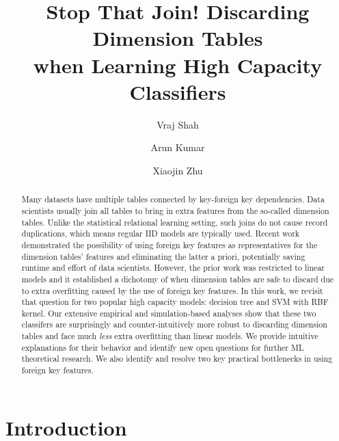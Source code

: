 \documentclass[sigconf]{acmart}
\begin{document}
\title{Stop That Join! Discarding Dimension Tables \\when Learning High Capacity Classifiers}

\author{Vraj Shah}
\author{Arun Kumar}
\author{Xiaojin Zhu}

\begin{abstract}
Many datasets have multiple tables connected by key-foreign key dependencies.
Data scientists usually join all tables to bring in extra features from the so-called 
dimension tables. Unlike the statistical relational learning setting, such joins do 
not cause record duplications, which means regular IID models are typically used. Recent
work demonstrated the possibility of using foreign key features as representatives for the 
dimension tables' features and eliminating the latter a priori, potentially saving runtime
and effort of data scientists. However, the prior work was restricted to linear models 
and it established a dichotomy of when dimension tables are safe to discard due to extra
overfitting caused by the use of foreign key features. In this work, we revisit that question 
for two popular high capacity models: decision tree and SVM with RBF kernel. Our 
extensive empirical and simulation-based analyses show that these two classifers are surprisingly and 
counter-intuitively more robust to discarding dimension tables and face much \textit{less} extra overfitting 
than linear models. We provide intuitive explanations for their behavior and identify new open 
questions for further ML theoretical research. We also identify and resolve two key practical 
bottlenecks in using foreign key features.
\end{abstract}


\maketitle

\section{Introduction}
\end{document}

